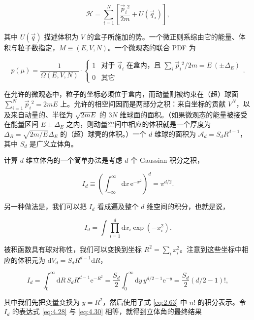 \begin{equation}\label{eq:4.26}
  \mathscr H=\sum_{i=1}^N\left[\frac{\vec p_i{}^2}{2m}+U(\vec q_i)\right],
\end{equation}

其中 $U(\vec q)$ 描述体积为 $V$ 的盒子所施加的势。一个微正则系综由它的能量、体积与粒子数指定，$M\equiv(E,V,N)$。一个微观态的联合 PDF 为

\begin{equation}\label{eq:4.27}
  p(\mu)=\frac{1}{\Omega(E,V,N)}\cdot
  \begin{cases}1 & \text{对于 }\vec q_i\text{ 在盒内，且 }\sum_i\vec p_i{}^2/2m=E\ (\pm\Delta_E)\\ 0 & \text{其它}\end{cases}.
\end{equation}

在允许的微观态中，粒子的坐标必须位于盒内，而动量则被约束在（超）球面 $\sum_{i=1}^N\vec p_i{}^2=2mE$ 上。允许的相空间因而是两部分之积：来自坐标的贡献 $V^N$，以及来自动量的、半径为 $\sqrt{2mE}$ 的 $3N$ 维球面的面积。（如果微观态的能量被接受在能量区间 $E\pm\Delta_E$ 之内，则动量空间中相应的体积就是一个厚度为 $\Delta_R=\sqrt{2m/E}\Delta_E$ 的（超）球壳的体积。）一个 $d$ 维球的面积为 $\mathcal{A}_d=S_dR^{d-1}$，其中 $S_d$ 是广义立体角。

计算 $d$ 维立体角的一个简单办法是考虑 $d$ 个 Gaussian 积分之积，

\begin{equation}\label{eq:4.28}
  I_d\equiv\left(\int_{-\infty}^{\infty}\mathrm{d}x\,\mathrm{e}^{-x^2}\right)^d=\pi^{d/2}.
\end{equation}

另一种做法是，我们可以把 $I_d$ 看成遍及整个 $d$ 维空间的积分，也就是说，

\begin{equation}\label{eq:4.29}
  I_d=\int\prod_{i=1}^d\mathrm{d}x_i\exp\left(-x_i^2\right).
\end{equation}

被积函数具有球对称性，我们可以变换到坐标 $R^2=\sum_ix_i^2$。注意到这些坐标中相应的体积元为 $\mathrm{d}V_d=S_dR^{d-1}\mathrm{d}R$，

\begin{equation}\label{eq:4.30}
  I_d=\int_0^\infty\mathrm{d}R\,S_dR^{d-1}\mathrm{e}^{-R^2}=\frac{S_d}{2}\int_0^\infty\mathrm{d}y\,y^{d/2-1}\mathrm{e}^{-y}=\frac{S_d}{2}(d/2-1)!,
\end{equation}

其中我们先把变量变换为 $y=R^2$，然后使用了式 \eqref{eq:2.63} 中 $n!$ 的积分表示。令 $I_d$ 的表达式 \eqref{eq:4.28} 与 \eqref{eq:4.30} 相等，就得到立体角的最终结果

